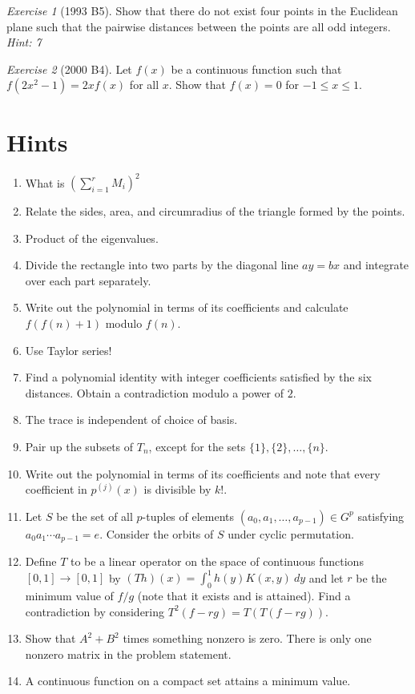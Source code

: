 \documentclass{article}
\theoremstyle{definition}
\theoremstyle{remark}
\newtheorem{exercise}{Exercise}
\begin{document}
\begin{exercise}[1993 B5]
Show that there do not exist four points in the Euclidean plane such that the pairwise distances between the points are all odd integers. \emph{Hint: 7} 
\end{exercise}

\begin{exercise}[2000 B4]
Let $f(x)$ be a continuous function such that $f(2x^{2} - 1) = 2xf(x)$ for all $x$. Show that $f(x) = 0$ for $-1 \leq x \leq 1$. 
\end{exercise}

\pagebreak
\section{Hints}
\begin{enumerate}[label=\textbf{\arabic*.}]
    \item What is $\left(\sum_{i=1}^r M_i\right)^2$
    \item Relate the sides, area, and circumradius of the triangle formed by the points.
    \item Product of the eigenvalues.
    \item Divide the rectangle into two parts by the diagonal line $ay=bx$ and integrate over each part separately.
    \item Write out the polynomial in terms of its coefficients and calculate $f(f(n)+1)$ modulo $f(n)$.
    \item Use Taylor series!
    \item Find a polynomial identity with integer coefficients satisfied by the six distances. Obtain a contradiction modulo a power of $2$. 
    \item The trace is independent of choice of basis.
    \item Pair up the subsets of $T_n$, except for the sets $\{1\},\{2\},\dots,\{n\}$.
    \item Write out the polynomial in terms of its coefficients and note that every coefficient in $p^{(j)}(x)$ is divisible by $k!$.
    \item Let $S$ be the set of all $p$-tuples of elements $(a_0,a_1,\dots,a_{p-1})\in G^p$ satisfying $a_0a_1\cdots a_{p-1}=e$. Consider the orbits of $S$ under cyclic permutation.
    \item Define $T$ to be a linear operator on the space of continuous functions $[0,1]\to [0,1]$ by $(Th)(x)=\int_0^1 h(y)K(x,y)\ dy$ and let $r$ be the minimum value of $f/g$ (note that it exists and is attained). Find a contradiction by considering $T^2(f-rg)=T(T(f-rg))$.
    \item Show that $A^2+B^2$ times something nonzero is zero. There is only one nonzero matrix in the problem statement.
    \item A continuous function on a compact set attains a minimum value.
\end{enumerate}
\end{document}
